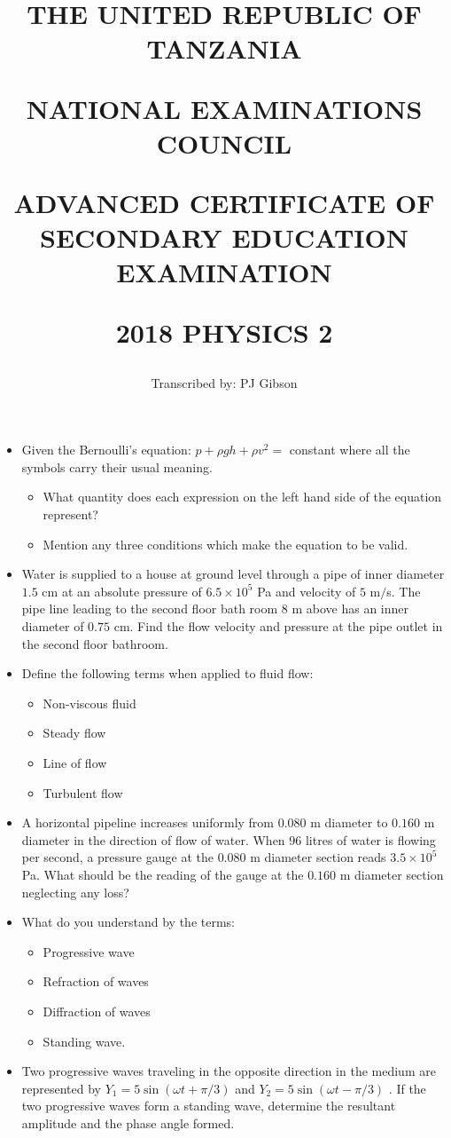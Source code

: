 \documentclass{article}
\title{THE UNITED REPUBLIC OF TANZANIA

NATIONAL EXAMINATIONS COUNCIL

ADVANCED CERTIFICATE OF SECONDARY EDUCATION EXAMINATION

\textbf{2018 PHYSICS 2}}
\author{Transcribed by:  PJ Gibson}
\begin{document}
\maketitle

\begin{itemize}
\item Given the Bernoulli’s equation: $ p+\rho gh+\rho v^{2}=$ constant where all the symbols carry their usual meaning.
 \begin{itemize}
\item What quantity does each expression on the left hand side of the equation represent? 
\item Mention any three conditions which make the equation to be valid. 
\end{itemize}
\item Water is supplied to a house at ground level through a pipe of inner diameter $ 1.5$ cm at an absolute pressure of $ 6.5 \times 10^{5}$ Pa and velocity of $ 5$ m$/$s. The pipe line leading to the second floor bath room $ 8$ m above has an inner diameter of $ 0.75$ cm. Find the flow velocity and pressure at the pipe outlet in the second floor bathroom. 
\item Define the following terms when applied to fluid flow:
 \begin{itemize}
\item Non-viscous fluid 
\item Steady flow 
\item Line of flow 
\item Turbulent flow
\end{itemize}
\item A horizontal pipeline increases uniformly from $ 0.080$ m diameter to $ 0.160$ m diameter in the direction of flow of water. When $ 96$ litres of water is flowing per second, a pressure gauge at the $ 0.080$ m diameter section reads $ 3.5 \times 10^{5}$ Pa. What should be the reading of the gauge at the $ 0.160$ m diameter section neglecting any loss? 
\item What do you understand by the terms:
 \begin{itemize}
\item Progressive wave 
\item Refraction of waves 
\item Diffraction of waves 
\item Standing wave. 
\end{itemize}
\item Two progressive waves traveling in the opposite direction in the medium are represented by $ Y_{1}=5 \sin(\omega t+\pi/3)$ and  $ Y_{2}=5 \sin(\omega t- \pi/3)$ . If the two progressive waves form a standing wave, determine the resultant amplitude and the phase angle formed. 

\end{itemize}
\end{document}
